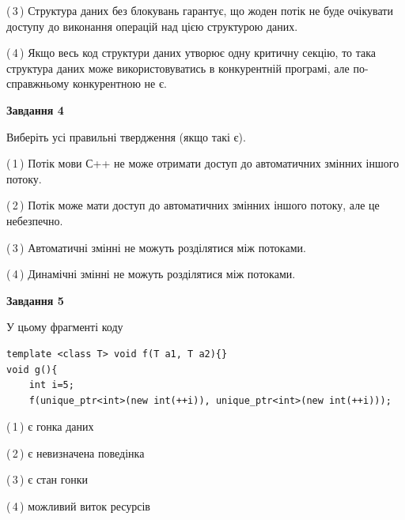 \documentclass[12pt, ukrainian]{article}
\begin{document}
\begin {large}
{(\,3\,) Структура даних без блокувань гарантує, що жоден потік не буде очікувати доступу до виконання операцій над цією структурою даних.%

(\,4\,) Якщо весь код структури даних утворює одну критичну секцію, то така структура даних може використовуватись в конкурентній програмі, але по-справжньо\-му конкурентною не є.%



\begin{center}
\textbf{Завдання 4}
\end{center}
Виберіть усі правильні твердження (якщо такі є).\par

(\,1\,) Потік мови С++ не може отримати доступ до автоматичних змінних іншого потоку.%

(\,2\,) Потік може мати доступ до автоматичних змінних іншого потоку, але це небезпечно.%

(\,3\,) Автоматичні змінні не можуть розділятися між потоками.%

(\,4\,) Динамічні змінні не можуть розділятися між потоками.%



\begin{center}
\textbf{Завдання 5}
\end{center}
У цьому фрагменті коду
\begin{verbatim}
template <class T> void f(T a1, T a2){}
void g(){
    int i=5;
    f(unique_ptr<int>(new int(++i)), unique_ptr<int>(new int(++i)));
\end{verbatim}

(\,1\,) є гонка даних%

(\,2\,) є невизначена поведінка%

(\,3\,) є стан гонки%

(\,4\,) можливий виток ресурсів%


}
\end {large}
\end{document}
